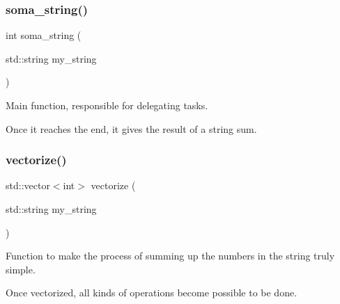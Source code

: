 \subsubsection{soma\+\_\+string()}
{\footnotesize\ttfamily int soma\+\_\+string (\begin{DoxyParamCaption}\item[{std\+::string}]{my\+\_\+string }\end{DoxyParamCaption})}



Main function, responsible for delegating tasks. 

Once it reaches the end, it gives the result of a string sum. \mbox{\label{string__soma_8hpp_a77eac4da5d157df321a5fd6d239721c2}} 
\subsubsection{vectorize()}
{\footnotesize\ttfamily std\+::vector$<$int$>$ vectorize (\begin{DoxyParamCaption}\item[{std\+::string}]{my\+\_\+string }\end{DoxyParamCaption})}



Function to make the process of summing up the numbers in the string truly simple. 

Once vectorized, all kinds of operations become possible to be done. 